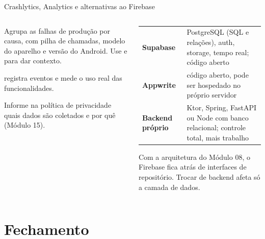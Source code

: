\documentclass[aspectratio=169,10pt]{beamer}
\begin{document}
\begin{frame}{Crashlytics, Analytics e alternativas ao Firebase}
  \begin{columns}[T]
    \begin{column}{0.48\textwidth}
      \begin{conceito}[Crashlytics]
        Agrupa as falhas de produção por causa, com pilha de chamadas, modelo do aparelho e versão do Android. Use  e  para dar contexto.
      \end{conceito}
      \begin{conceito}[Analytics]
         registra eventos e mede o uso real das funcionalidades.
      \end{conceito}
      \begin{atencao}[LGPD]
        Informe na política de privacidade quais dados são coletados e por quê (Módulo 15).
      \end{atencao}
    \end{column}
    \begin{column}{0.5\textwidth}
      \scriptsize
      \begin{tabularx}{\linewidth}{@{}l L@{}}
        \toprule
         &  \\
        \midrule
        \textbf{Supabase} & PostgreSQL (SQL e relações), auth, storage, tempo real; código aberto \\
        \textbf{Appwrite} & código aberto, pode ser hospedado no próprio servidor \\
        \textbf{Backend próprio} & Ktor, Spring, FastAPI ou Node com banco relacional; controle total, mais trabalho \\
        \bottomrule
      \end{tabularx}
      \begin{dica}
        Com a arquitetura do Módulo 08, o Firebase fica atrás de interfaces de repositório. Trocar de backend afeta só a camada de dados.
      \end{dica}
    \end{column}
  \end{columns}
\end{frame}

\section{Fechamento}
\end{document}
